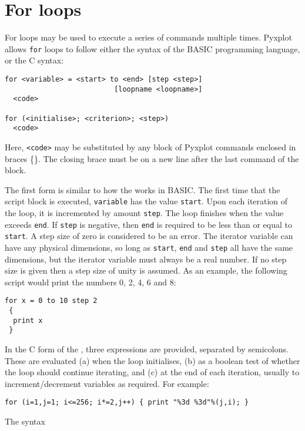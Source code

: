 \section{For loops}

For loops may be used to execute a series of commands multiple times. Pyxplot
allows {\tt for} loops to follow either the syntax of the BASIC programming
language, or the C syntax:

\begin{verbatim}
for <variable> = <start> to <end> [step <step>]
                          [loopname <loopname>]
  <code>

for (<initialise>; <criterion>; <step>)
  <code>
\end{verbatim}

\noindent Here, {\tt <code>} may be substituted by any block of Pyxplot
commands enclosed in braces \{\}. The closing brace must be on a new line after
the last command of the block.

The first form is similar to how the  works in BASIC.  The first
time that the script block is executed, {\tt variable} has the value {\tt start}. Upon each iteration
of the loop, it is incremented by amount {\tt step}. The loop finishes when
the value exceeds {\tt end}. If {\tt step} is negative, then {\tt end} is
required to be less than or equal to {\tt start}. A step size of zero is
considered to be an error.  The iterator variable can have any physical
dimensions, so long as {\tt start}, {\tt end} and {\tt step} all have the same
dimensions, but the iterator variable must always be a real number. If no step
size is given then a step size of unity is assumed.  As an example, the
following script would print the numbers 0, 2, 4, 6 and 8:

\begin{verbatim}
for x = 0 to 10 step 2
 {
  print x
 }
\end{verbatim}

In the C form of the , three expressions are provided, separated
by semicolons. These are evaluated (a) when the loop initialises, (b) as a
boolean test of whether the loop should continue iterating, and (c) at the end
of each iteration, usually to increment/decrement variables as required. For
example:

\begin{verbatim}
for (i=1,j=1; i<=256; i*=2,j++) { print "%3d %3d"%(j,i); }
\end{verbatim}

The syntax

